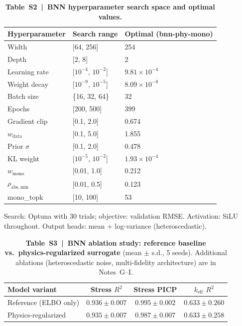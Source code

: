 \documentclass[11pt,a4paper]{article}
\newcommand{\keff}{\ensuremath{k_{\mathrm{eff}}}}
\begin{document}
\begin{table}[htbp]
\centering
\caption{\textbf{Table~S2~|~BNN hyperparameter search space and optimal
values.}}
\label{tab:S2}
\smallskip
\small
\begin{tabular}{lll}
\toprule
Hyperparameter & Search range & Optimal (bnn-phy-mono) \\
\midrule
Width           & [64, 256]           & 254 \\
Depth           & [2, 8]              & 2 \\
Learning rate   & [$10^{-4}$, $10^{-2}$] & $9.81\times10^{-4}$ \\
Weight decay    & [$10^{-9}$, $10^{-5}$] & $8.09\times10^{-8}$ \\
Batch size      & \{16, 32, 64\}      & 32 \\
Epochs          & [200, 500]          & 399 \\
Gradient clip   & [0.1, 2.0]          & 0.674 \\
$w_\mathrm{data}$ & [0.1, 5.0]       & 1.855 \\
Prior $\sigma$  & [0.1, 2.0]          & 0.478 \\
KL weight       & [$10^{-5}$, $10^{-2}$] & $1.93\times10^{-4}$ \\
$w_\mathrm{mono}$ & [0.01, 1.0]      & 0.212 \\
$\rho_\mathrm{abs,min}$ & [0.01, 0.5] & 0.123 \\
mono\_topk      & [10, 100]           & 53 \\
\bottomrule
\end{tabular}

\smallskip
Search: Optuna with 30 trials; objective: validation RMSE.
Activation: SiLU throughout. Output heads: mean + log-variance
(heteroscedastic).
\end{table}

\begin{table}[htbp]
\centering
\caption{\textbf{Table~S3~|~BNN ablation study: reference baseline vs.\
physics-regularized surrogate} (mean $\pm$ s.d., 5 seeds).
Additional ablations (heteroscedastic noise, multi-fidelity architecture)
are in Notes~G--I.}
\label{tab:S3}
\smallskip
\small
\begin{tabular}{lccc}
\toprule
Model variant & Stress $R^2$ & Stress PICP & \keff{} $R^2$ \\
\midrule
Reference (ELBO only) & $0.936\pm0.007$ & $0.995\pm0.002$ & $0.633\pm0.260$ \\
Physics-regularized   & $0.935\pm0.007$ & $0.987\pm0.007$ & $0.633\pm0.258$ \\
\bottomrule
\end{tabular}
\end{table}
\end{document}
